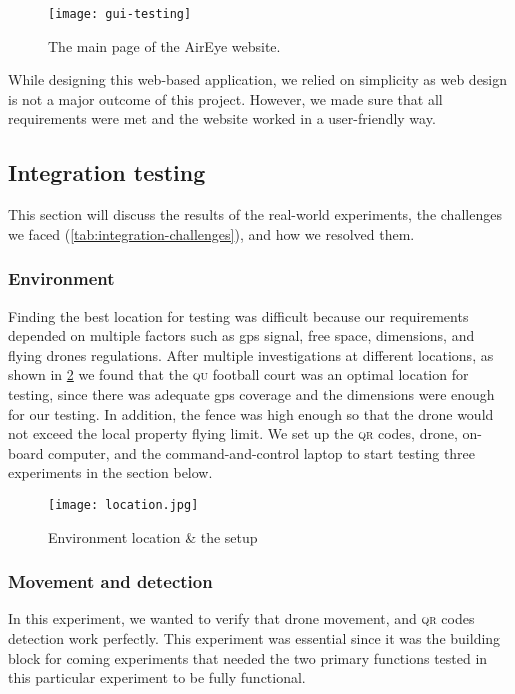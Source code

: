 \documentclass[../main.tex]{subfiles}
\begin{document}
\begin{figure}[tbp]
	\centering
	\texttt{[image: gui-testing]}
	\caption{The main page of the AirEye website.}
	\label{fig:gui-testing}
\end{figure}   

While designing this web-based application, we relied on simplicity as
web design is not a major outcome of this project. However, we made sure that 
all requirements were met and the website worked in a user-friendly way.


\subsection{Integration testing}

This section will discuss the results of the real-world experiments,
the challenges we faced (\cref{tab:integration-challenges}), and
how we resolved them.

\subsubsection{Environment}

Finding the best location for testing was difficult
because our requirements depended on multiple factors 
such as \gls{gps} signal, free space, dimensions,
and flying drones regulations. After multiple investigations
at different locations, as shown in \cref{fig:testing-location}
we found that the \textsc{qu} football court was an optimal location
for testing, since there was adequate \gls{gps} coverage and the
dimensions were enough for our testing. 
In addition, the fence was high enough so that
the drone would not exceed the local property flying limit.
We set up the \textsc{qr} codes, drone, on-board computer, and the
command-and-control laptop to start testing three experiments in the
section below.

\begin{figure}[H]
	\centering
	\texttt{[image: location.jpg]}
	\caption{Environment location \& the setup}
	\label{fig:testing-location}
\end{figure} 

\subsubsection{Movement and detection}

In this experiment, we wanted to verify that drone movement, and
\textsc{qr} codes detection work perfectly. This experiment was 
essential since it was the building block for coming experiments
that needed the two primary functions tested in this particular
experiment to be fully functional.
\end{document}
